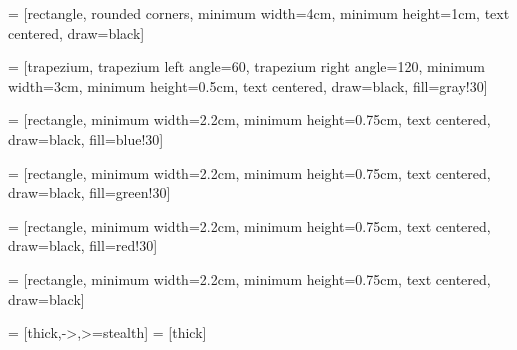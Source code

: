 \documentclass[landscape]{letter}
\begin{document}
\usetikzlibrary{shapes.geometric, arrows, trees}
 = [rectangle, rounded corners, minimum width=4cm, 
minimum height=1cm, text centered, draw=black]

 = [trapezium, trapezium left angle=60, trapezium right angle=120, 
minimum width=3cm, minimum height=0.5cm, text centered, draw=black, fill=gray!30]

 = [rectangle, minimum width=2.2cm, minimum height=0.75cm, 
text centered, draw=black, fill=blue!30]

 = [rectangle, minimum width=2.2cm, minimum height=0.75cm, 
text centered, draw=black, fill=green!30]

 = [rectangle, minimum width=2.2cm, minimum height=0.75cm, 
text centered, draw=black, fill=red!30]

 = [rectangle, minimum width=2.2cm, minimum height=0.75cm, 
text centered, draw=black]

 = [thick,->,>=stealth]
 = [thick]
\end{document}
